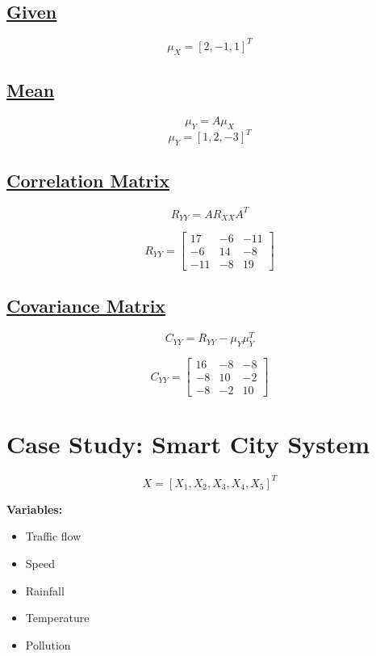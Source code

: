 \documentclass[11pt]{article}
\begin{document}
\vspace{0.5cm}
\subsection*{\underline{Given}}
\[
\mu_X = [2, -1, 1]^T
\]
\vspace{0.5cm}
\subsection*{\underline{Mean}}
\[
\mu_Y = A\mu_X
\]
\[
\mu_Y = [1, 2, -3]^T
\]
\vspace{0.5cm}
\subsection*{\underline{Correlation Matrix}}
\[
R_{YY} = AR_{XX}A^T
\]

\[
R_{YY} =
\begin{bmatrix}
17 & -6 & -11 \\
-6 & 14 & -8 \\
-11 & -8 & 19
\end{bmatrix}
\]

\vspace{0.5cm}
\subsection*{\underline{Covariance Matrix}}
\[
C_{YY} = R_{YY} - \mu_Y \mu_Y^T
\]

\[
C_{YY} =
\begin{bmatrix}
16 & -8 & -8 \\
-8 & 10 & -2 \\
-8 & -2 & 10
\end{bmatrix}
\]

\vspace{1cm}
\section{Case Study: Smart City System}

\[
X = [X_1, X_2, X_3, X_4, X_5]^T
\]

\textbf{Variables:}
\begin{itemize}
    \item Traffic flow
    \item Speed
    \item Rainfall
    \item Temperature
    \item Pollution
\end{itemize}
\end{document}
